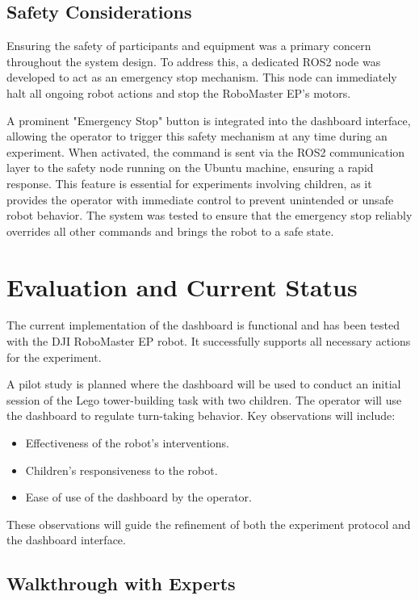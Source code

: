 \documentclass[a4paper]{usiinfbachelorproject}
\begin{document}
\subsection{\textbf{Safety Considerations}}
Ensuring the safety of participants and equipment was a primary concern throughout the system design.
To address this, a dedicated ROS2 node was developed to act as an emergency stop mechanism.
This node can immediately halt all ongoing robot actions and stop the RoboMaster EP's motors.

A prominent "Emergency Stop" button is integrated into the dashboard interface, allowing the operator to trigger this safety mechanism at any time during an experiment.
When activated, the command is sent via the ROS2 communication layer to the safety node running on the Ubuntu machine, ensuring a rapid response.
This feature is essential for experiments involving children, as it provides the operator with immediate control to prevent unintended or unsafe robot behavior.
The system was tested to ensure that the emergency stop reliably overrides all other commands and brings the robot to a safe state.


\section{\textbf{Evaluation and Current Status}}\label{sec:evaluation}

The current implementation of the dashboard is functional and has been tested with the DJI RoboMaster EP robot. It successfully supports all necessary actions for the experiment.

A pilot study is planned where the dashboard will be used to conduct an initial session of the Lego tower-building task with two children. The operator will use the dashboard to regulate turn-taking behavior. Key observations will include:
\begin{itemize}
    \item Effectiveness of the robot's interventions.
    \item Children's responsiveness to the robot.
    \item Ease of use of the dashboard by the operator.
\end{itemize}

These observations will guide the refinement of both the experiment protocol and the dashboard interface.

\subsection{\textbf{Walkthrough with Experts}}
\end{document}
